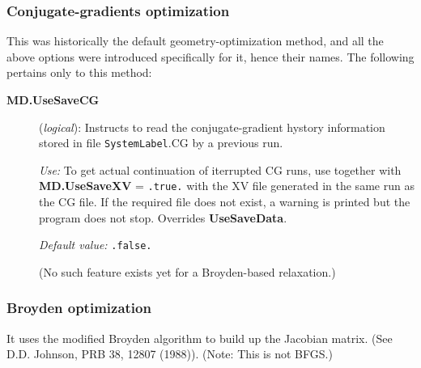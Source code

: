 \documentclass[11pt]{article}
\begin{document}
\subsubsection{Conjugate-gradients optimization}

This was historically the default geometry-optimization method, and
all the above options were introduced specifically for it, hence their
names. The following pertains only to this method:

\begin{description}
\item[{\bf MD.UseSaveCG}] ({\it logical}):
Instructs to read the conjugate-gradient hystory information stored
in file {\tt SystemLabel}.CG by a previous run.

{\it Use:} To get actual continuation of iterrupted CG runs, use
together with {\bf MD.UseSaveXV} = {\tt .true.} with the XV
file generated in the same run as the CG file.
If the required file does not exist, a warning is
printed but the program does not stop. Overrides {\bf UseSaveData}.

{\it Default value:} {\tt .false.}

(No such feature exists yet for a Broyden-based relaxation.)

\end{description}

\subsubsection{Broyden optimization}

It uses the modified Broyden algorithm to
build up the Jacobian matrix. (See D.D. Johnson, PRB 38, 12807
(1988)). (Note: This is not BFGS.)
\end{document}
